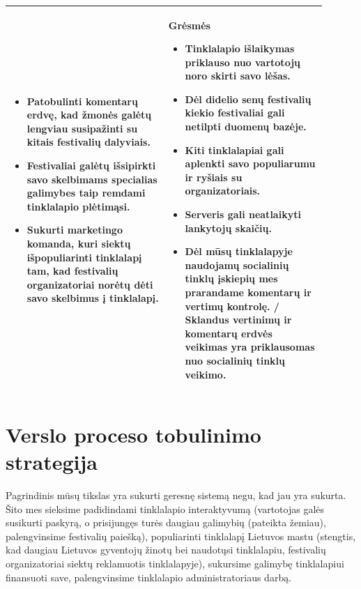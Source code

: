 \documentclass{VUMIFPSkursinis}
\begin{document}
\begin{longtable}{|p{0.45\linewidth}|p{0.45\linewidth}|}
\begin{itemize}
	\item Patobulinti komentarų erdvę, kad žmonės galėtų lengviau susipažinti su kitais festivalių dalyviais.
	\item Festivaliai galėtų išsipirkti savo  skelbimams specialias galimybes taip remdami tinklalapio plėtimąsi.
	\item Sukurti marketingo komanda, kuri siektų išpopuliarinti tinklalapį tam, kad festivalių organizatoriai norėtų dėti savo skelbimus į tinklalapį.
  \end{itemize}
  &
  \textbf{Grėsmės}
  \begin{itemize}
	\item Tinklalapio išlaikymas priklauso nuo vartotojų noro skirti savo lėšas.
	\item Dėl didelio senų festivalių kiekio festivaliai gali netilpti duomenų bazėje.
	\item Kiti tinklalapiai gali aplenkti savo populiarumu ir ryšiais su organizatoriais.
	\item Serveris gali neatlaikyti lankytojų skaičių.
	\item Dėl mūsų tinklalapyje naudojamų socialinių tinklų įskiepių mes prarandame komentarų ir vertimų kontrolę. / Sklandus vertinimų ir komentarų erdvės veikimas yra priklausomas nuo socialinių tinklų veikimo.
  \end{itemize}\\
  \hline
\end{longtable}

\section{Verslo proceso tobulinimo strategija}
Pagrindinis mūsų tikslas yra sukurti geresnę sistemą negu, kad jau yra sukurta. Šito mes sieksime padidindami tinklalapio interaktyvumą (vartotojas galės susikurti paskyrą, o prisijungęs turės daugiau galimybių (pateikta žemiau), palengvinsime festivalių paiešką), populiarinti tinklalapį Lietuvos mastu (stengtis, kad daugiau Lietuvos gyventojų žinotų bei naudotųsi tinklalapiu, festivalių organizatoriai siektų reklamuotis tinklalapyje), sukursime galimybę tinklalapiui finansuoti save, palengvinsime tinklalapio administratoriaus darbą.
\end{document}
